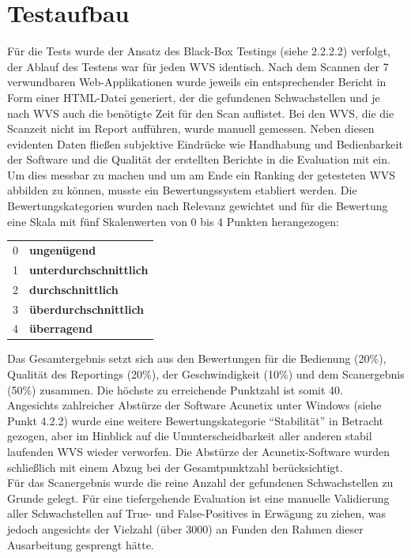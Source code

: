 \documentclass[12pt,oneside,a4paper,parskip]{scrbook}
\begin{document}
  \section{Testaufbau}
  Für die Tests wurde der Ansatz des Black-Box Testings (siehe 2.2.2.2) verfolgt, der Ablauf des Testens war für jeden WVS identisch.
  Nach dem Scannen der 7 verwundbaren Web-Applikationen wurde jeweils ein entsprechender Bericht in Form einer HTML-Datei generiert, der die gefundenen Schwachstellen und je nach WVS auch die benötigte Zeit für den Scan auflistet. Bei den WVS, die die Scanzeit nicht im Report aufführen, wurde manuell gemessen.
  Neben diesen evidenten Daten fließen subjektive Eindrücke wie Handhabung und Bedienbarkeit der Software und die Qualität der erstellten Berichte in die Evaluation mit ein.\\
  Um dies messbar zu machen und um am Ende ein Ranking der getesteten WVS abbilden zu können, musste ein Bewertungssystem etabliert werden. Die Bewertungskategorien wurden nach Relevanz gewichtet und für die Bewertung eine Skala mit fünf Skalenwerten von 0 bis 4 Punkten herangezogen:
  \begin{table}[H]
     \begin{tabular}{ll}
     0         & \textbf{ungenügend}             \\
     1         & \textbf{unterdurchschnittlich}  \\
     2         & \textbf{durchschnittlich}       \\
     3         & \textbf{überdurchschnittlich}   \\
     4         & \textbf{überragend}
     \end{tabular}
   \end{table}
   Das Gesamtergebnis setzt sich aus den Bewertungen für die Bedienung (20\%), Qualität des Reportings (20\%), der Geschwindigkeit (10\%) und dem Scanergebnis (50\%) zusammen. Die höchste zu erreichende Punktzahl ist somit 40.\\
   Angesichts zahlreicher Abstürze der Software Acunetix unter Windows (siehe Punkt 4.2.2) wurde eine weitere Bewertungskategorie ``Stabilität'' in Betracht gezogen, aber im Hinblick auf die Ununterscheidbarkeit aller anderen stabil laufenden WVS wieder verworfen. Die Abstürze der Acunetix-Software wurden schließlich mit einem Abzug bei der Gesamtpunktzahl berücksichtigt.\\
   Für das Scanergebnis wurde die reine Anzahl der gefundenen Schwachstellen zu Grunde gelegt. Für eine tiefergehende Evaluation ist eine manuelle Validierung aller Schwachstellen auf True- und False-Positives in Erwägung zu ziehen, was jedoch angesichts der Vielzahl (über 3000) an Funden den Rahmen dieser Ausarbeitung gesprengt hätte.
\end{document}
